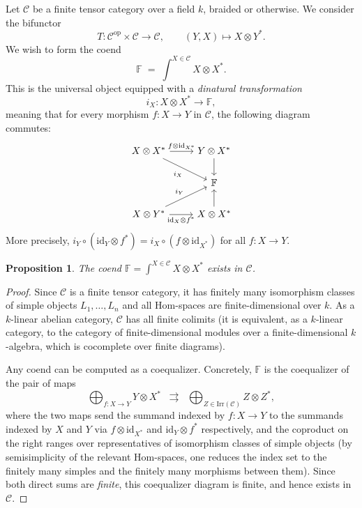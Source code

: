 \documentclass[11pt]{article}
\newcommand{\Hom}{\mathrm{Hom}}
\newcommand{\C}{\mathcal{C}}
\newcommand{\F}{\mathbb{F}}
\newcommand{\op}{\mathrm{op}}
\newcommand{\id}{\mathrm{id}}
\newtheorem{proposition}[theorem]{Proposition}
\theoremstyle{definition}
\begin{document}
Let $\C$ be a finite tensor category over a field $k$, braided or otherwise. We consider the bifunctor
\[
T : \C^{\op} \times \C \longrightarrow \C, \qquad (Y, X) \longmapsto X \otimes Y^*.
\]
We wish to form the coend
\[
\F \;=\; \int^{X \in \C} X \otimes X^*.
\]
This is the universal object equipped with a \emph{dinatural transformation}
\[
i_X : X \otimes X^* \longrightarrow \F,
\]
meaning that for every morphism $f : X \to Y$ in $\C$, the following diagram commutes:
\[
\begin{tikzcd}
X \otimes X^* \arrow[r, "f \otimes \id_{X^*}"] \arrow[dr, "i_X"'] & Y \otimes X^* \arrow[d] \\
 & \F \\
X \otimes Y^* \arrow[r, "\id_X \otimes f^*"'] \arrow[ur, "i_Y"] & X \otimes X^* \arrow[u]
\end{tikzcd}
\]
More precisely, $i_Y \circ (\id_Y \otimes f^*) = i_X \circ (f \otimes \id_{X^*})$ for all $f: X \to Y$.

\begin{proposition}
The coend $\F = \int^{X \in \C} X \otimes X^*$ exists in $\C$.
\end{proposition}

\begin{proof}
Since $\C$ is a finite tensor category, it has finitely many isomorphism classes of simple objects $L_1, \ldots, L_n$ and all $\Hom$-spaces are finite-dimensional over $k$. As a $k$-linear abelian category, $\C$ has all finite colimits (it is equivalent, as a $k$-linear category, to the category of finite-dimensional modules over a finite-dimensional $k$-algebra, which is cocomplete over finite diagrams).

Any coend can be computed as a coequalizer. Concretely, $\F$ is the coequalizer of the pair of maps
\[
\bigoplus_{f : X \to Y} Y \otimes X^* \;\;\rightrightarrows\;\; \bigoplus_{Z \in \mathrm{Irr}(\C)} Z \otimes Z^*,
\]
where the two maps send the summand indexed by $f: X \to Y$ to the summands indexed by $X$ and $Y$ via $f \otimes \id_{X^*}$ and $\id_Y \otimes f^*$ respectively, and the coproduct on the right ranges over representatives of isomorphism classes of simple objects (by semisimplicity of the relevant Hom-spaces, one reduces the index set to the finitely many simples and the finitely many morphisms between them). Since both direct sums are \emph{finite}, this coequalizer diagram is finite, and hence exists in $\C$.
\end{proof}
\end{document}
